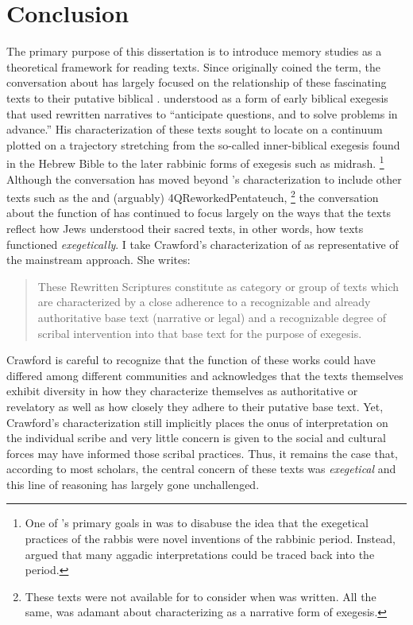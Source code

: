 
\chapter*{Conclusion}


The primary purpose of this dissertation is to introduce memory studies as a theoretical framework for reading \rwb texts. Since \Vermes originally coined the term, the conversation about \rwb has largely focused on the relationship of these fascinating texts to their putative biblical \vorlagen. \vermes understood \rwb as a form of early biblical exegesis that used rewritten narratives to ``anticipate questions, and to solve problems in advance.''%
    \autocite[95]{vermes1961}
His characterization of these texts sought to locate \rwb on a continuum plotted on a trajectory stretching from the so-called inner-biblical exegesis found in the Hebrew Bible to the later rabbinic forms of exegesis such as midrash.%
    \footnote{One of \vermes's primary goals in  was to disabuse the idea that the exegetical practices of the rabbis were novel inventions of the rabbinic period. Instead, \vermes argued that many aggadic interpretations could be traced back into the \secondtemple period.}
Although the conversation has moved beyond \vermes's characterization to include other texts such as the \templescroll and (arguably) 4QReworkedPentateuch,%
    \footnote{These texts were not available for \vermes to consider when  was written. All the same, \vermes was adamant about characterizing \rwb as a narrative form of exegesis.}    
the conversation about the function of \rwb has continued to focus largely on the ways that the \rwb texts reflect how \secondtemple Jews understood their sacred texts, in other words, how \rwb texts functioned \emph{exegetically}. I take Crawford's characterization of  \rwb as representative of the mainstream approach. She writes:
\begin{quote}
    These Rewritten Scriptures constitute as category or group of texts which are characterized by a close adherence to a recognizable and already authoritative base text (narrative or legal) and a recognizable degree of scribal intervention into that base text for the purpose of exegesis.\autocite[12--13]{crawford2008}
\end{quote}
\noindent
Crawford is careful to recognize that the function of these works could have differed among different communities and acknowledges that the texts themselves exhibit diversity in how they characterize themselves as authoritative or revelatory as well as how closely they adhere to their putative base text.%
    \autocite[13]{crawford2008}
Yet, Crawford's characterization still implicitly places the onus of interpretation on the individual scribe and very little concern is given to the social and cultural forces may have informed those scribal practices. Thus, it remains the case that, according to most scholars, the central concern of these texts was \emph{exegetical} and this line of reasoning has largely gone unchallenged. 

